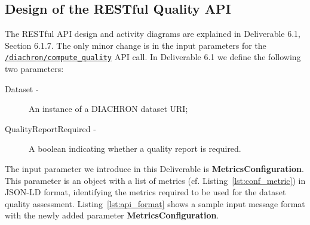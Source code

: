 
\subsection{Design of the RESTful Quality API}
\label{sec:RestAPI} 
The RESTful API design and activity diagrams are explained in Deliverable 6.1, Section 6.1.7.
The only minor change is in the input parameters for the \texttt{\url{/diachron/compute_quality}} API call.
In Deliverable 6.1 we define the following two parameters:
\begin{description}
\item[Dataset -] An instance of a DIACHRON dataset URI;
\item[QualityReportRequired -] A boolean indicating whether a quality report is required.
\end{description}
The input parameter we introduce in this Deliverable is \textbf{MetricsConfiguration}.
This parameter is an object with a list of metrics (cf. Listing~\ref{lst:conf_metric}) in JSON-LD format, identifying the metrics required to be used for the dataset quality assessment.
Listing~\ref{lst:api_format} shows a sample input message format with the newly added parameter \textbf{MetricsConfiguration}.
 
